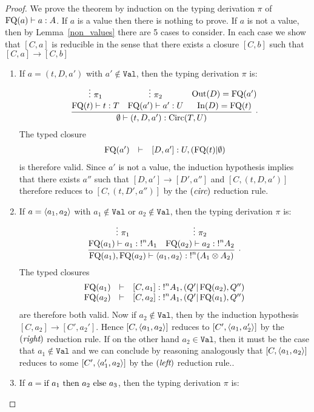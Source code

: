 \documentclass[twoside]{article}
\begin{document}
\begin{proof}
We prove the theorem by induction on the typing derivation $\pi$ of 
$\mathop{\textrm{FQ}}\nolimits(a)\vdash a:A$. If $a$ is a value then there is nothing 
to prove. If $a$ is not a value, then by 
Lemma~\hyperref[non_values]{\ref*{non_values}} there are 5 cases to consider. 
In each case we show that $[C,a]$ is reducible in the sense that there exists a 
closure  $[C,b]$ such that $[C,a]\to[C,b]$
\begin{enumerate}
  \item If $a=(t,D,a')$ with $a'\notin \mathtt{Val}$, then the typing derivation 
  $\pi$ is:
  \[
  \infer[.]{\emptyset\entails (t,D,a'):\Circ(T,U)}{
    \deduce[]{\FQ(t)\entails t:T}{
      \vdots ~\pi_1
    }
    &
    \deduce[]{\FQ(a')\entails a':U}{
      \vdots ~\pi_2     
    }
    &
    \deduce[]{\In(D)=\FQ(t)}{
      \Out(D)=\FQ(a')
    }
  }   
  \]
  The typed closure 
  \[
  \begin{array}{rcl}
  \mathop{\textrm{FQ}}\nolimits(a') & \vdash & [D,a']:U,(\mathop{\textrm{FQ}}\nolimits(t)|\emptyset)
  \end{array}
  \]
  is therefore valid. Since $a'$ 
  is not a value, the induction hypothesis implies that there exists $a''$ such 
  that $[D,a']\to [D',a'']$ and $[C,(t,D,a')]$ therefore reduces to 
  $[C,(t,D',a'')]$ by the $(\textit{circ})$ reduction rule.
  \item If $a=\langle a_1,a_2\rangle$ with $a_1\notin \mathtt{Val}$ or $a_2\notin \mathtt{Val}$,
  then the typing derivation $\pi$ is:
  \[
  \infer[.]{\FQ(a_1),\FQ(a_2)\entails \p{a_1,a_2}:{!}^n(A_1\x A_2)}{
    \deduce[]{\FQ(a_1)\entails a_1:{!}^nA_1}{
      \vdots~\pi_1
    }
    & 
    \deduce[]{\FQ(a_2)\entails a_2:{!}^nA_2}{
      \vdots~\pi_2
    }
  }
  \] 
  The typed closures 
  \[
  \begin{array}{rcl}
  \mathop{\textrm{FQ}}\nolimits(a_1) & \vdash & [C,a_1]:{!}^nA_1,(Q'|\mathop{\textrm{FQ}}\nolimits(a_2),Q'')\\
  \mathop{\textrm{FQ}}\nolimits(a_2) & \vdash & [C,a_2]:{!}^nA_1, (Q'|\mathop{\textrm{FQ}}\nolimits(a_1),Q'')
  \end{array}
  \]
  are therefore both valid. 
  Now if $a_2\notin\mathtt{Val}$, then by the induction hypothesis 
  $[C,a_2]\to[C',a_2']$. Hence $[C,\langle a_1,a_2\rangle]$ reduces to $[C',\langle a_1,a_2'\rangle]$ 
  by the $(\textit{right})$ reduction rule.
  If on the other hand $a_2\in\mathtt{Val}$, then it must be the case that $a_1\notin\mathtt{Val}$ 
  and we can conclude by reasoning analogously that $[C,\langle a_1,a_2\rangle]$ reduces to 
  some $[C',\langle a_1',a_2\rangle]$ by the $(\textit{left})$ reduction rule.. 
  \item If $a=\textrm{\rm if}~ a_1 ~\textrm{\rm then}~ a_2 ~\textrm{\rm else}~ a_3$, then the typing derivation $\pi$ is:

\end{enumerate}
\end{proof}
\end{document}
